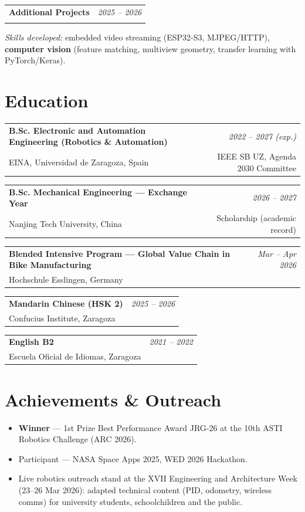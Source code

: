 \documentclass[10pt,a4paper]{article}
\makeatletter
\newcommand{\entry}[4]{%
  \noindent\begin{tabularx}{\textwidth}{@{}X r@{}}
    \textbf{#1} & \textit{\small #2}\\
    \textcolor{cvgray}{\small #3} & \textcolor{cvgray}{\small #4}\\
  \end{tabularx}\par\vspace{0.5pt}
}
\makeatother
\begin{document}
\entry{Additional Projects}{2025 -- 2026}{}{}
\textit{Skills developed:} embedded video streaming (ESP32-S3, MJPEG/HTTP), \textbf{computer vision} (feature matching, multiview geometry, transfer learning with PyTorch/Keras).

\section*{Education}
\entry{B.Sc. Electronic and Automation Engineering (Robotics \& Automation)}{2022 -- 2027 (exp.)}
      {EINA, Universidad de Zaragoza, Spain}{IEEE SB UZ, Agenda 2030 Committee}
\entry{B.Sc. Mechanical Engineering --- Exchange Year}{2026 -- 2027}
      {Nanjing Tech University, China}{Scholarship (academic record)}
\entry{Blended Intensive Program --- Global Value Chain in Bike Manufacturing}{Mar -- Apr 2026}
      {Hochschule Esslingen, Germany}{}
\entry{Mandarin Chinese (HSK 2)}{2025 -- 2026}{Confucius Institute, Zaragoza}{}
\entry{English B2}{2021 -- 2022}{Escuela Oficial de Idiomas, Zaragoza}{}

\section*{Achievements \& Outreach}
\begin{itemize}
  \item \textbf{Winner} --- 1st Prize \textperiodcentered{} Best Performance Award \textperiodcentered{} JRG-26 at the 10th ASTI Robotics Challenge (ARC 2026).
  \item Participant --- NASA Space Apps 2025, WED 2026 Hackathon.
  \item Live robotics outreach stand at the XVII Engineering and Architecture Week (23--26 Mar 2026): adapted technical content (PID, odometry, wireless comms) for university students, schoolchildren and the public.
\end{itemize}
\end{document}
